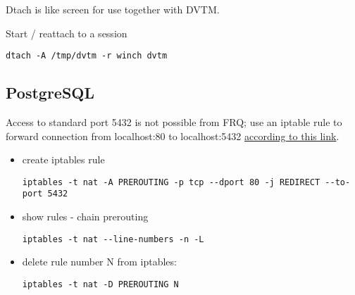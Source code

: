 Dtach is like screen for use together with DVTM.

Start / reattach to a session

\begin{verbatim}
dtach -A /tmp/dvtm -r winch dvtm
\end{verbatim}

\subsection{PostgreSQL}\label{postgresql}

Access to standard port 5432 is not possible from FRQ; use an iptable rule to forward connection from localhost:80 to localhost:5432 \href{see:\%20http://serverfault.com/questions/112795/how-can-i-run-a-server-on-linux-on-port-80-as-a-normal-user}{according to this link}.

\begin{itemize}

\item create iptables rule

\begin{verbatim}
iptables -t nat -A PREROUTING -p tcp --dport 80 -j REDIRECT --to-port 5432
\end{verbatim}

\item show rules - chain prerouting

\begin{verbatim}
iptables -t nat --line-numbers -n -L
\end{verbatim}

\item delete rule number N from iptables:

\begin{verbatim}
iptables -t nat -D PREROUTING N
\end{verbatim}


\end{itemize}
